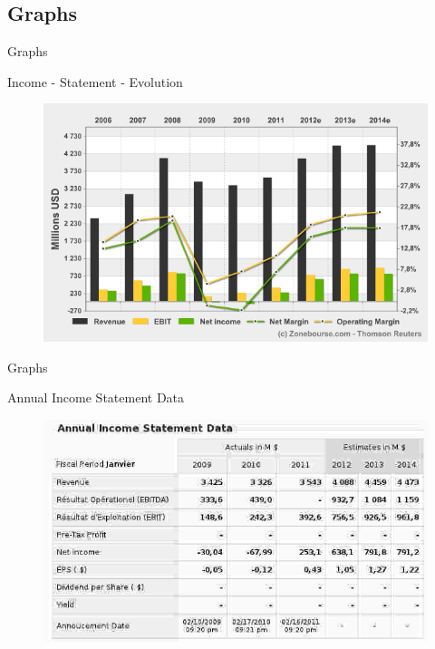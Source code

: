 \documentclass{beamer}
\begin{document}
\subsection{Graphs}
\begin{frame}{Graphs}
	\begin{block}{Income - Statement - Evolution}
		\begin{figure}[h]
			\includegraphics[width=0.90\textheight]{./Income_Statement_Evolution.png}
		\end{figure}
	\end{block}	
\end{frame}
\begin{frame}{Graphs}
	\begin{block}{Annual Income Statement Data}
		\begin{figure}[h]
			\includegraphics[width=0.90\textheight]{./Annual_Income_SD_NVIDIA.jpeg}
		\end{figure}
	\end{block}	
\end{frame}
\end{document}
